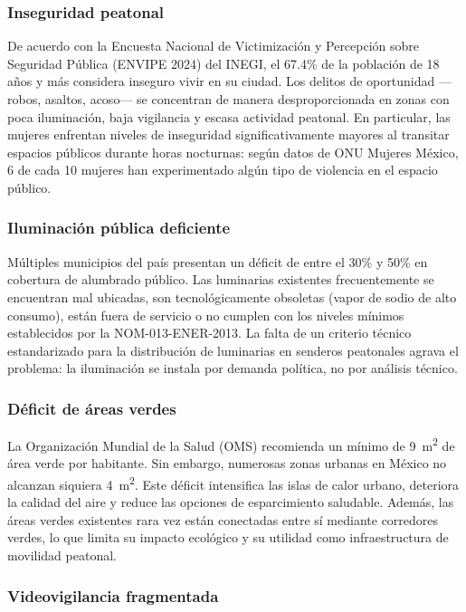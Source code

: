 \documentclass[12pt,a4paper]{article}
\begin{document}
\subsubsection{Inseguridad peatonal}

De acuerdo con la Encuesta Nacional de Victimización y Percepción sobre Seguridad Pública (ENVIPE 2024) del INEGI, el 67.4\% de la población de 18 años y más considera inseguro vivir en su ciudad. Los delitos de oportunidad —robos, asaltos, acoso— se concentran de manera desproporcionada en zonas con poca iluminación, baja vigilancia y escasa actividad peatonal. En particular, las mujeres enfrentan niveles de inseguridad significativamente mayores al transitar espacios públicos durante horas nocturnas: según datos de ONU Mujeres México, 6 de cada 10 mujeres han experimentado algún tipo de violencia en el espacio público.

\subsubsection{Iluminación pública deficiente}

Múltiples municipios del país presentan un déficit de entre el 30\% y 50\% en cobertura de alumbrado público. Las luminarias existentes frecuentemente se encuentran mal ubicadas, son tecnológicamente obsoletas (vapor de sodio de alto consumo), están fuera de servicio o no cumplen con los niveles mínimos establecidos por la NOM-013-ENER-2013. La falta de un criterio técnico estandarizado para la distribución de luminarias en senderos peatonales agrava el problema: la iluminación se instala por demanda política, no por análisis técnico.

\subsubsection{Déficit de áreas verdes}

La Organización Mundial de la Salud (OMS) recomienda un mínimo de 9~m\textsuperscript{2} de área verde por habitante. Sin embargo, numerosas zonas urbanas en México no alcanzan siquiera 4~m\textsuperscript{2}. Este déficit intensifica las islas de calor urbano, deteriora la calidad del aire y reduce las opciones de esparcimiento saludable. Además, las áreas verdes existentes rara vez están conectadas entre sí mediante corredores verdes, lo que limita su impacto ecológico y su utilidad como infraestructura de movilidad peatonal.

\subsubsection{Videovigilancia fragmentada}
\end{document}
